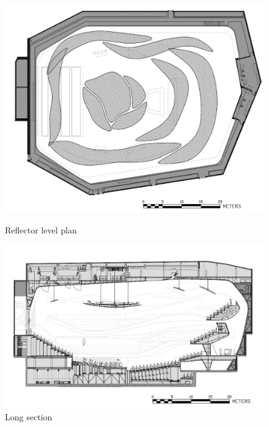 \begin{figure}[htbp]
 \begin{minipage}{0.5\hsize}
  \begin{center}
   \includegraphics[scale=0.15]{01_att/PLAN_Reflector_Level.jpg}
  \end{center}
  \caption{\hspace{1mm}Reflector level plan}
 \end{minipage}
 \begin{minipage}{0.5\hsize}
  \begin{center}
   \includegraphics[scale=0.15]{01_att/SECTION_Long.jpg}
  \end{center}
  \caption{\hspace{1mm}Long section}
 \end{minipage}
\end{figure}
